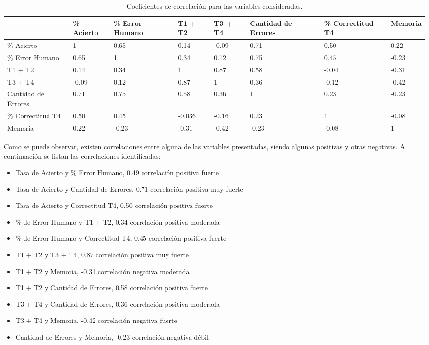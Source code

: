 \begin{table}[H]
\centering
\footnotesize
\begin{tabular}{|p{1.8cm}|p{1.6cm}|p{1.6cm}|p{1.6cm}|p{1.6cm}|p{1.6cm}|p{1.6cm}|p{1.6cm}|}
\hline
                    &    \% Acierto & \% Error Humano & T1 + T2 & T3 + T4 & Cantidad de Errores & \% Correctitud T4 & Memoria \\
\hline
\% Acierto     & 1 & 0.65 & 0.14 & -0.09 & 0.71 & 0.50 & 0.22 \\
\% Error Humano        & 0.65 & 1 & 0.34 & 0.12 & 0.75 & 0.45 & -0.23 \\
T1 + T2                & 0.14 & 0.34 & 1 & 0.87 & 0.58 & -0.04 & -0.31 \\
T3 + T4                & -0.09 & 0.12 & 0.87 & 1 & 0.36 & -0.12 & -0.42 \\
Cantidad de Errores    & 0.71 & 0.75 & 0.58 & 0.36 & 1 & 0.23 & -0.23 \\
\% Correctitud T4         & 0.50 & 0.45 & -0.036 & -0.16 & 0.23 & 1 & -0.08 \\
Memoria                & 0.22 & -0.23 & -0.31 & -0.42 & -0.23 & -0.08 & 1 \\
\hline
\end{tabular}
\caption{Coeficientes de correlaci\'on para las variables consideradas.}
\label{sec:tabla-correlacion}
\end{table}

Como se puede observar, existen correlaciones entre alguna de las variables presentadas, 
siendo algunas positivas y otras negativas. A continuaci\'on se listan las correlaciones identificadas:

\begin{itemize}
    \item Tasa de Acierto y \% Error Humano, 0.49 correlaci\'on positiva fuerte
    \item Tasa de Acierto y Cantidad de Errores, 0.71 correlaci\'on positiva muy fuerte
    \item Tasa de Acierto y Correctitud T4, 0.50 correlaci\'on positiva fuerte 
    \item \% de Error Humano y T1 + T2, 0.34 correlaci\'on positiva moderada
    \item \% de Error Humano y Correctitud T4, 0.45 correlaci\'on positiva fuerte
    \item T1 + T2 y T3 + T4, 0.87 correlaci\'on positiva muy fuerte
    \item T1 + T2 y Memoria, -0.31 correlaci\'on negativa moderada
    \item T1 + T2 y Cantidad de Errores, 0.58 correlaci\'on positiva fuerte
    \item T3 + T4 y Cantidad de Errores, 0.36 correlaci\'on positiva moderada
    \item T3 + T4 y Memoria, -0.42 correlaci\'on negativa fuerte
    \item Cantidad de Errores y Memoria, -0.23 correlaci\'on negativa d\'ebil
\end{itemize}
